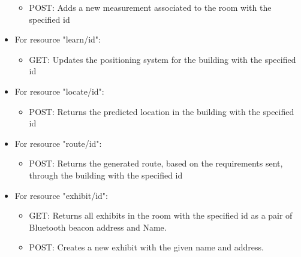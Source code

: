 \begin{itemize}
\begin{itemize}
	\item POST: Adds a new measurement associated to the room with the specified id
	\end{itemize}
\item For resource "learn/id":
	\begin{itemize}
	\item GET: Updates the positioning system for the building with the specified id
	\end{itemize}
\item For resource "locate/id":
	\begin{itemize}
	\item POST: Returns the predicted location in the building with the specified id
	\end{itemize}
\item For resource "route/id":
	\begin{itemize}
	\item POST: Returns the generated route, based on the requirements sent, through the building with the specified id
	\end{itemize}
\item For resource "exhibit/id":
	\begin{itemize}
	\item GET: Returns all exhibits in the room with the specified id as a pair of Bluetooth beacon address and Name.
	\item POST: Creates a new exhibit with the given name and address.
	\end{itemize}
\end{itemize}

